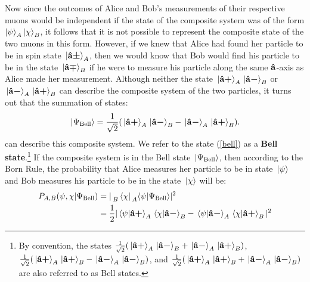 Now since the outcomes of Alice and Bob's measurements of their respective muons would be independent if the state of the composite system was of the form $\ket{\psi}_A\ket{\chi}_B$, it follows that it is not possible to represent the composite state of the two muons in this form. However, if we knew that Alice had found her particle to be in spin state $\ket*{\vb{\hat{{a}}}\bm{\pm}}_A$, then we would know that Bob would find his particle to be in the state $\ket*{\vb{\hat{{a}}}\bm{\mp}}_B$ if he were to measure his particle along the same $\vb{\hat{{a}}}$-axis as Alice made her measurement. Although neither the state $\ket*{\vb{\hat{{a}}}\bm{+}}_A\ket*{\vb{\hat{{a}}}\bm{-}}_B$ or $\ket*{\vb{\hat{{a}}}\bm{-}}_A\ket*{\vb{\hat{{a}}}\bm{+}}_B$ can describe the composite system of the two particles, it turns out that the summation of states:
\begin{equation}\label{bell}
    \ket*{\Psi_{\text{Bell}}}=\frac{1}{\sqrt{2}}(\ket*{\vb{\hat{{a}}}\bm{+}}_A\ket*{\vb{\hat{{a}}}\bm{-}}_B-\ket*{\vb{\hat{{a}}}\bm{-}}_A\ket*{\vb{\hat{{a}}}\bm{+}}_B).
\end{equation}
can describe this composite system. 
We refer to the state (\ref{bell}) as a \textbf{Bell state}.\footnote{By convention, the states $ \frac{1}{\sqrt{2}}(\ket*{\vb{\hat{{a}}}\bm{+}}_A\ket*{\vb{\hat{{a}}}\bm{-}}_B+\ket*{\vb{\hat{{a}}}\bm{-}}_A\ket*{\vb{\hat{{a}}}\bm{+}}_B)$, $ \frac{1}{\sqrt{2}}(\ket*{\vb{\hat{{a}}}\bm{+}}_A\ket*{\vb{\hat{{a}}}\bm{+}}_B-\ket*{\vb{\hat{{a}}}\bm{-}}_A\ket*{\vb{\hat{{a}}}\bm{-}}_B)$, and $ \frac{1}{\sqrt{2}}(\ket*{\vb{\hat{{a}}}\bm{+}}_A\ket*{\vb{\hat{{a}}}\bm{+}}_B+\ket*{\vb{\hat{{a}}}\bm{-}}_A\ket*{\vb{\hat{{a}}}\bm{-}}_B)$ are also referred to as Bell states.} If the composite system is in the Bell state $\ket*{\Psi_{\text{Bell}}}$, then according to the Born Rule, the probability that Alice measures her particle to be in state $\ket*{\psi}$ and Bob measures his particle to be in the state $\ket*{\chi}$ will be:
\begin{equation}
\begin{split}
    P_{A,B}(\psi,\chi|\Psi_{\text{Bell}})&=|\prescript{}{B}{ \bra*{\chi}}\prescript{}{A}{ \ip{\psi}{\Psi_{\text{Bell}}}}|^2\\
        &=\frac{1}{2}|\ip*{\psi}{\uvbp{a}}_A\ip*{\chi}{\uvbm{a}}_B-\ip*{\psi}{\uvbm{a}}_A\ip*{\chi}{\uvbp{a}}_B|^2
\end{split}
\end{equation}
